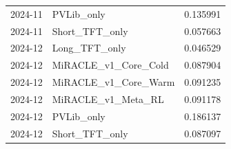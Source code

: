\begin{tabular}{llr}
2024-11 & PVLib_only & 0.135991 \\
2024-11 & Short_TFT_only & 0.057663 \\
2024-12 & Long_TFT_only & 0.046529 \\
2024-12 & MiRACLE_v1_Core_Cold & 0.087904 \\
2024-12 & MiRACLE_v1_Core_Warm & 0.091235 \\
2024-12 & MiRACLE_v1_Meta_RL & 0.091178 \\
2024-12 & PVLib_only & 0.186137 \\
2024-12 & Short_TFT_only & 0.087097 \\
\bottomrule
\end{tabular}
